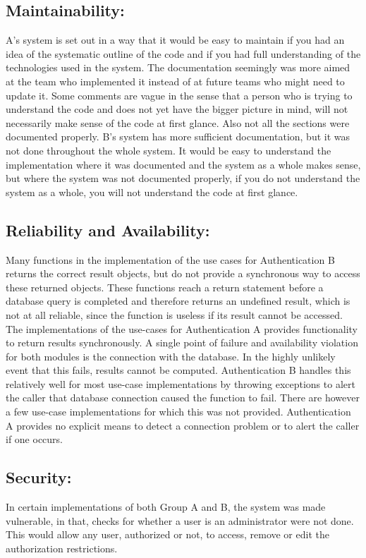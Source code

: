 \subsection{Maintainability:}
A's system is set out in a way that it would be easy to maintain if you had an idea of the systematic outline of the code and if you had full understanding of the technologies used in the system. The documentation seemingly was more aimed at the team who implemented it instead of at future teams who might need to update it. Some comments are vague in the sense that a person who is trying to understand the code and does not yet have the bigger picture in mind, will not necessarily make sense of the code at first glance. Also not all the sections were documented properly.
B's system has more sufficient documentation, but it was not done throughout the whole system. It would be easy to understand the implementation where it was documented and the system as a whole makes sense, but where the system was not documented properly, if you do not understand the system as a whole, you will not understand the code at first glance. 

\subsection{Reliability and Availability:}
Many functions in the implementation of the use cases for Authentication B returns the correct result objects, but do not provide a synchronous way to access these returned objects. These functions reach a return statement before a database query is completed and therefore returns an undefined result, which is not at all reliable, since the function is useless if its result cannot be accessed. 
The implementations of the use-cases for Authentication A provides functionality to return results synchronously.
A single point of failure and availability violation for both modules is the connection with the database. In the highly unlikely event that this fails, results cannot be computed. Authentication B handles this relatively well for most use-case implementations by throwing exceptions to alert the caller that database connection caused the function to fail. There are however a few use-case implementations for which this was not provided. Authentication A provides no explicit means to detect a connection problem or to alert the caller if one occurs.

\subsection{Security:}
In certain implementations of both  Group A and B, the system was made vulnerable, in that, checks for whether a user is an administrator were not done. This would allow any user, authorized or not, to access, remove or edit the authorization restrictions.

